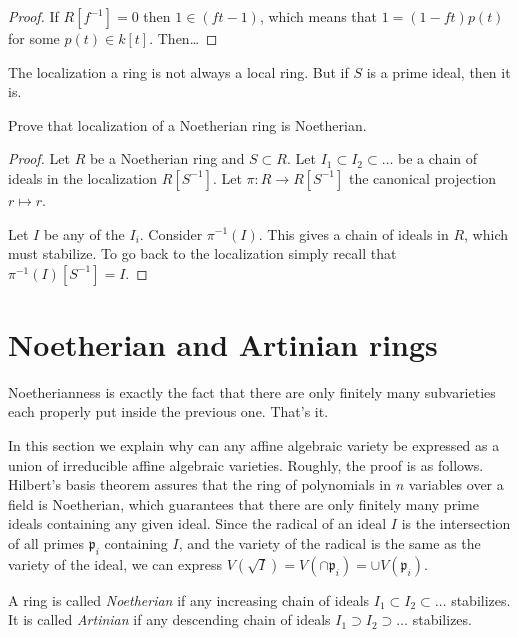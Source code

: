 \begin{proof}
If $R[f^{-1}]=0$ then $1 \in (ft-1)$,
which means that $1=(1-ft)p(t)$ for some
$p(t) \in k[t]$.
Then…
\end{proof}

\noindent
The localization a ring is not always a local
ring.
But if $S$ is a prime ideal, then it is.


\begin{exercise}
\label{exercise-local-noeth-noeth}
Prove that localization of a Noetherian ring
is Noetherian.
\end{exercise}

\begin{proof}
Let $R$ be a Noetherian ring and $S \subset
R$.
Let $I_1\subset I_2 \subset…$
be a chain of ideals in the localization
$R[S^{-1}]$.
Let $\pi:R \to R[S^{-1}]$ the canonical
projection $r \mapsto r$.

Let $I$ be any of the $I_i$.
Consider $\pi^{-1}(I)$. This gives a chain of
ideals in $R$,
which must stabilize.
To go back to the localization simply recall
that
$\pi^{-1}(I)[S^{-1}]=I$.
\end{proof}






\noindent
\section{Noetherian and Artinian rings}
\label{section-noetherian-and-artinian-rings}

\noindent 
Noetherianness is exactly the fact
that there are only finitely many
subvarieties each properly put inside the
previous one. That's it.

\medskip\noindent
In this section we explain
why can any affine algebraic variety
be expressed as a union of irreducible
affine algebraic varieties.
Roughly, the proof is as follows.
Hilbert's basis theorem
assures that the ring of polynomials
in $n$ variables over a field is
Noetherian, which guarantees
that there are only finitely many
prime ideals containing any given ideal.
Since the radical of an ideal $I$ is
the intersection of all primes
$\mathfrak{p}_i$ containing $I$,
and the variety of the radical is
the same as the variety of the ideal,
we can express $V(\sqrt{I})
= V(\cap\mathfrak{p}_i)
=\cup V(\mathfrak{p}_i)$.

\begin{definition}
\label{definition-noetherian-artinian-rings}
A ring is called {\it Noetherian}
if any increasing chain of
ideals $I_1 \subset I_2 \subset…$
stabilizes. It is called {\it Artinian}
if any descending chain of
ideals $I_1 \supset I_2\supset…$
stabilizes.
\end{definition}

